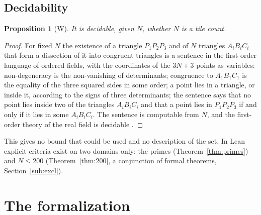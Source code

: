 \documentclass[11pt,reqno]{amsart}
\theoremstyle{plain}
\newtheorem{proposition}[theorem]{Proposition}
\theoremstyle{definition}
\newcommand{\sW}{\textup{\textsf{W}}}
\begin{document}
\subsection{Decidability}

\begin{proposition}[\sW]\label{prop:decidable}
It is decidable, given $N$, whether $N$ is a tile count.
\end{proposition}

\begin{proof}
For fixed $N$ the existence of a triangle $P_1P_2P_3$ and of $N$ triangles $A_iB_iC_i$ that form a
dissection of it into congruent triangles is a sentence in the first-order language of ordered fields, with
the coordinates of the $3N+3$ points as variables: non-degeneracy is the non-vanishing of determinants;
congruence to $A_1B_1C_1$ is the equality of the three squared sides in some order; a point lies in a
triangle, or inside it, according to the signs of three determinants; the sentence says that no point lies
inside two of the triangles $A_iB_iC_i$ and that a point lies in $P_1P_2P_3$ if and only if it lies in some
$A_iB_iC_i$. The sentence is computable from $N$, and the first-order theory of the real field is decidable
\cite{Tarski}.
\end{proof}

This gives no bound that could be used and no description of the set. In Lean explicit criteria exist
on two domains only: the primes (Theorem~\ref{thm:primes}) and $N\le200$ (Theorem~\ref{thm:200}, a
conjunction of formal theorems, Section~\ref{sub:excl}).

\appendix

\section{The formalization}\label{sec:formal}
\end{document}
